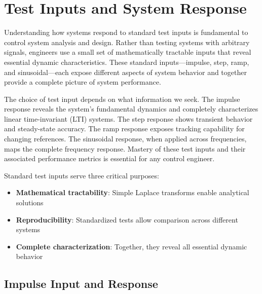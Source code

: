 
\chapter{Test Inputs and System Response}
\label{ch:test_inputs}

Understanding how systems respond to standard test inputs is fundamental to control system analysis and design. Rather than testing systems with arbitrary signals, engineers use a small set of mathematically tractable inputs that reveal essential dynamic characteristics. These standard inputs---impulse, step, ramp, and sinusoidal---each expose different aspects of system behavior and together provide a complete picture of system performance.

The choice of test input depends on what information we seek. The impulse response reveals the system's fundamental dynamics and completely characterizes linear time-invariant (LTI) systems. The step response shows transient behavior and steady-state accuracy. The ramp response exposes tracking capability for changing references. The sinusoidal response, when applied across frequencies, maps the complete frequency response. Mastery of these test inputs and their associated performance metrics is essential for any control engineer.

\begin{keyconceptbox}[title=Why Standard Test Inputs?]
Standard test inputs serve three critical purposes:
\begin{itemize}
    \item \textbf{Mathematical tractability}: Simple Laplace transforms enable analytical solutions
    \item \textbf{Reproducibility}: Standardized tests allow comparison across different systems
    \item \textbf{Complete characterization}: Together, they reveal all essential dynamic behavior
\end{itemize}
\end{keyconceptbox}

\section{Impulse Input and Response}
\label{sec:impulse}

